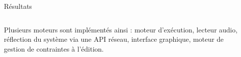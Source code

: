 \begin{columns}[t]
\begin{column}{\onecolwid}
\begin{block}{Résultats}
          	\begin{columns}[t]
          		\begin{column}{\onecolwid}\justify
                      Plusieurs moteurs sont implémentés ainsi : moteur d'exécution, 
                      lecteur audio, réflection du système via une API réseau, interface graphique, 
                      moteur de gestion de contraintes à l'édition.
          		\end{column}
          	\end{columns}        
            \end{block}
        \end{column}         
   \begin{column}{\sepwid}\end{column}		
\end{columns}

